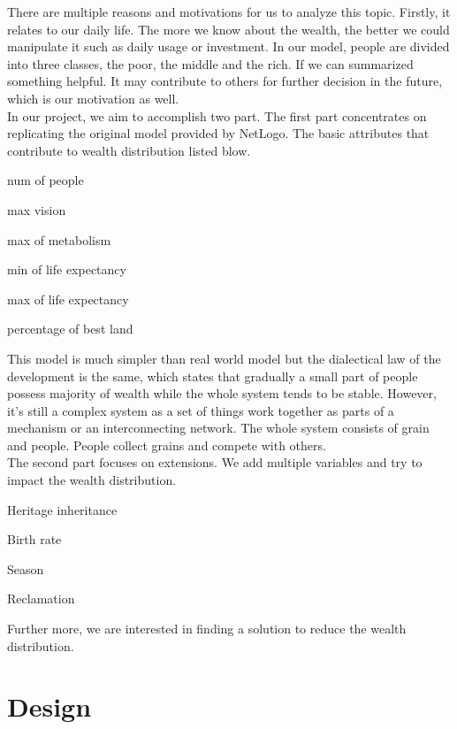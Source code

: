 There are multiple reasons and motivations for us to analyze this topic. Firstly, it relates to our daily life. The more we know about the wealth, the better we could manipulate it such as daily usage or investment. In our model, people are divided into three classes, the poor, the middle and the rich. If we can summarized something helpful. It may contribute to others for further decision in the future, which is our motivation as well.\\

In our project, we aim to accomplish two part. The first part concentrates on replicating the original model provided by NetLogo. The basic attributes that contribute to wealth distribution listed blow.
  \begin{AutoMultiColItemize}
	\item num of people
	\item max vision
	\item max of metabolism
	\item min of life expectancy
	\item max of life expectancy
	\item percentage of best land
\end{AutoMultiColItemize}
This model is much simpler than real world model but the dialectical law of the development is the same, which states that gradually a small part of people possess majority of wealth while the whole system tends to be stable. However, it's still a complex system as a set of things work together as parts of a mechanism or an interconnecting network. The whole system consists of grain and people. People collect grains and compete with others.\\


The second part focuses on extensions. We add multiple variables and try to impact the wealth distribution.
   \begin{AutoMultiColItemize}
 	\item Heritage inheritance
 	\item Birth rate
 	\item Season
 	\item Reclamation
 \end{AutoMultiColItemize}
Further more, we are interested in finding a solution to reduce the wealth distribution.
\section{Design}
